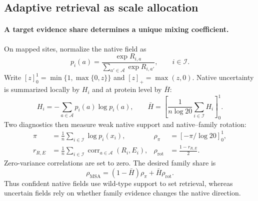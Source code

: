 \documentclass{article} %
\begin{document}
\subsection{Adaptive retrieval as scale allocation}
\label{sec:fusion}

\paragraph{A target evidence share determines a unique mixing coefficient.}
On mapped sites, normalize the native field as
\begin{equation}
p_i(a)=\frac{\exp R_{i,a}}{\sum_{a'\in\mathcal A}\exp R_{i,a'}},
\qquad i\in\mathcal I.
\label{eq:cue_marginal}
\end{equation}
Write $[z]_0^1=\min\{1,\max\{0,z\}\}$ and $[z]_+=\max(z,0)$. Native uncertainty is summarized locally by $H_i$ and at protein level by $\bar H$:
\begin{equation}
H_i=-\sum_{a\in\mathcal A}p_i(a)\log p_i(a),
\qquad
\bar H=\left[\frac{1}{n\log 20}\sum_{i\in\mathcal I}H_i\right]_0^1.
\label{eq:normalized_entropy}
\end{equation}
Two diagnostics then measure weak native support and native--family rotation:
\begin{equation}
\begin{aligned}
\pi&=\frac{1}{n}\sum_{i\in\mathcal I}\log p_i(x_i), &
\rho_\pi&=[-\pi/\log 20]_0^1,\\
r_{R,E}&=\frac{1}{n}\sum_{i\in\mathcal I}\operatorname{corr}_{a\in\mathcal A}(R_i,E_i), &
\rho_{\mathrm{rot}}&=\frac{1-r_{R,E}}{2}.
\end{aligned}
\label{eq:field_alignment}
\end{equation}
Zero-variance correlations are set to zero. The desired family share is
\begin{equation}
\rho_{\mathrm{MSA}}=(1-\bar H)\rho_\pi+\bar H\rho_{\mathrm{rot}}.
\label{eq:pref_map}
\end{equation}
Thus confident native fields use wild-type support to set retrieval, whereas uncertain fields rely on whether family evidence changes the native direction.
\end{document}

